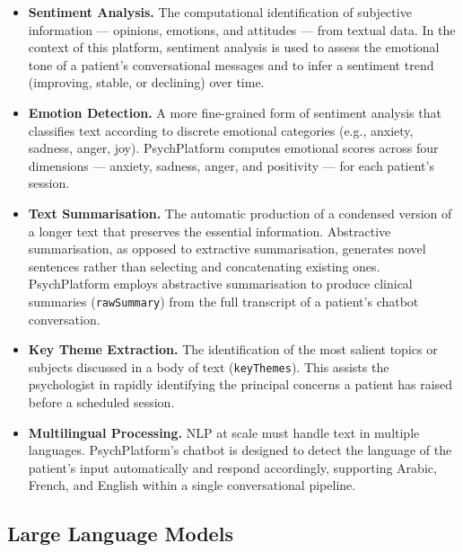 \begin{itemize}[leftmargin=1.5em, itemsep=6pt]

  \item \textbf{Sentiment Analysis.} The computational identification of
        subjective information — opinions, emotions, and attitudes — from
        textual data. In the context of this platform, sentiment analysis is
        used to assess the emotional tone of a patient's conversational messages
        and to infer a sentiment trend (improving, stable, or declining) over
        time.

  \item \textbf{Emotion Detection.} A more fine-grained form of sentiment
        analysis that classifies text according to discrete emotional categories
        (e.g., anxiety, sadness, anger, joy). PsychPlatform computes emotional
        scores across four dimensions — anxiety, sadness, anger, and positivity
        — for each patient's session.

  \item \textbf{Text Summarisation.} The automatic production of a condensed
        version of a longer text that preserves the essential information.
        Abstractive summarisation, as opposed to extractive summarisation,
        generates novel sentences rather than selecting and concatenating
        existing ones. PsychPlatform employs abstractive summarisation to
        produce clinical summaries (\texttt{rawSummary}) from the full
        transcript of a patient's chatbot conversation.

  \item \textbf{Key Theme Extraction.} The identification of the most salient
        topics or subjects discussed in a body of text (\texttt{keyThemes}).
        This assists the psychologist in rapidly identifying the principal
        concerns a patient has raised before a scheduled session.

  \item \textbf{Multilingual Processing.} NLP at scale must handle text in
        multiple languages. PsychPlatform's chatbot is designed to detect the
        language of the patient's input automatically and respond accordingly,
        supporting Arabic, French, and English within a single conversational
        pipeline.

\end{itemize}

\subsection{Large Language Models}
\label{subsec:llm}

